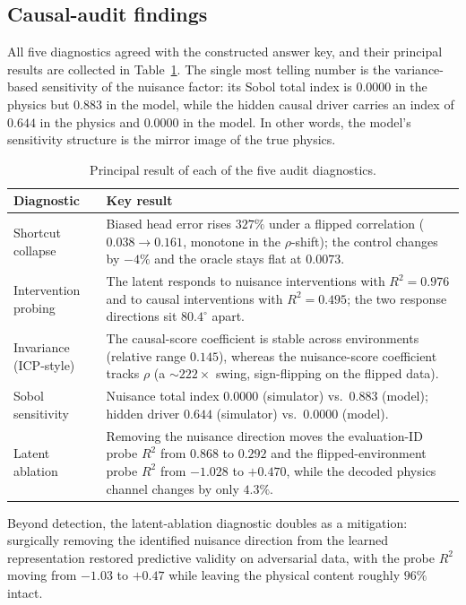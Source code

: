 \documentclass[11pt]{article}
\begin{document}
\subsection{Causal-audit findings}

All five diagnostics agreed with the constructed answer key, and their principal results are
collected in Table~\ref{tab:diagnostics}. The single most telling number is the variance-based
sensitivity of the nuisance factor: its Sobol total index is $0.0000$ in the physics but $0.883$ in
the model, while the hidden causal driver carries an index of $0.644$ in the physics and $0.0000$
in the model. In other words, the model's sensitivity structure is the mirror image of the true
physics.

\begin{table}[H]
\centering
\caption{Principal result of each of the five audit diagnostics.}
\label{tab:diagnostics}
\begin{tabular}{@{}p{}p{}@{}}
\toprule
\textbf{Diagnostic} & \textbf{Key result} \\
\midrule
Shortcut collapse &
Biased head error rises $327\%$ under a flipped correlation ($0.038 \to 0.161$, monotone in the
$\rho$-shift); the control changes by $-4\%$ and the oracle stays flat at $0.0073$. \\
\addlinespace
Intervention probing &
The latent responds to nuisance interventions with $R^2 = 0.976$ and to causal interventions with
$R^2 = 0.495$; the two response directions sit $80.4^\circ$ apart. \\
\addlinespace
Invariance (ICP-style) &
The causal-score coefficient is stable across environments (relative range $0.145$), whereas the
nuisance-score coefficient tracks $\rho$ (a $\sim\!222\times$ swing, sign-flipping on the flipped
data). \\
\addlinespace
Sobol sensitivity &
Nuisance total index $0.0000$ (simulator) vs.\ $0.883$ (model); hidden driver $0.644$ (simulator)
vs.\ $0.0000$ (model). \\
\addlinespace
Latent ablation &
Removing the nuisance direction moves the evaluation-ID probe $R^2$ from $0.868$ to $0.292$ and the
flipped-environment probe $R^2$ from $-1.028$ to $+0.470$, while the decoded physics channel
changes by only $4.3\%$. \\
\bottomrule
\end{tabular}
\end{table}

Beyond detection, the latent-ablation diagnostic doubles as a mitigation: surgically removing the
identified nuisance direction from the learned representation restored predictive validity on
adversarial data, with the probe $R^2$ moving from $-1.03$ to $+0.47$ while leaving the physical
content roughly $96\%$ intact.
\end{document}
